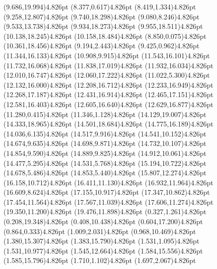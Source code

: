 \documentclass[10pt]{article}
\begin{document}
{{\qdisk(9.686,19.994){4.826pt}%
\qdisk(8.377,0.617){4.826pt}%
\qdisk(8.419,1.334){4.826pt}%
\qdisk(9.258,12.807){4.826pt}%
\qdisk(9.740,18.298){4.826pt}%
\qdisk(9.080,8.246){4.826pt}%
\qdisk(9.533,13.738){4.826pt}%
\qdisk(9.934,18.273){4.826pt}%
\qdisk(9.955,18.511){4.826pt}%
\qdisk(10.138,18.245){4.826pt}%
\qdisk(10.158,18.484){4.826pt}%
\qdisk(8.850,0.075){4.826pt}%
\qdisk(10.361,18.456){4.826pt}%
\qdisk(9.194,2.443){4.826pt}%
\qdisk(9.425,0.962){4.826pt}%
\qdisk(11.344,16.133){4.826pt}%
\qdisk(10.908,9.915){4.826pt}%
\qdisk(11.543,16.101){4.826pt}%
\qdisk(11.732,16.068){4.826pt}%
\qdisk(11.838,17.019){4.826pt}%
\qdisk(11.932,16.034){4.826pt}%
\qdisk(12.010,16.747){4.826pt}%
\qdisk(12.060,17.222){4.826pt}%
\qdisk(11.022,5.300){4.826pt}%
\qdisk(12.132,16.000){4.826pt}%
\qdisk(12.208,16.712){4.826pt}%
\qdisk(12.233,16.949){4.826pt}%
\qdisk(12.268,17.187){4.826pt}%
\qdisk(12.431,16.914){4.826pt}%
\qdisk(12.465,17.151){4.826pt}%
\qdisk(12.581,16.403){4.826pt}%
\qdisk(12.605,16.640){4.826pt}%
\qdisk(12.629,16.877){4.826pt}%
\qdisk(11.280,0.415){4.826pt}%
\qdisk(11.346,1.128){4.826pt}%
\qdisk(14.129,19.007){4.826pt}%
\qdisk(14.333,18.965){4.826pt}%
\qdisk(14.501,18.684){4.826pt}%
\qdisk(14.775,16.189){4.826pt}%
\qdisk(14.036,6.135){4.826pt}%
\qdisk(14.517,9.916){4.826pt}%
\qdisk(14.541,10.152){4.826pt}%
\qdisk(14.674,9.635){4.826pt}%
\qdisk(14.698,9.871){4.826pt}%
\qdisk(14.732,10.107){4.826pt}%
\qdisk(14.854,9.590){4.826pt}%
\qdisk(14.889,9.825){4.826pt}%
\qdisk(14.912,10.061){4.826pt}%
\qdisk(14.477,5.295){4.826pt}%
\qdisk(14.531,5.768){4.826pt}%
\qdisk(15.194,10.722){4.826pt}%
\qdisk(14.678,5.486){4.826pt}%
\qdisk(14.853,5.440){4.826pt}%
\qdisk(15.807,12.274){4.826pt}%
\qdisk(16.158,10.712){4.826pt}%
\qdisk(16.411,11.130){4.826pt}%
\qdisk(16.932,11.964){4.826pt}%
\qdisk(16.609,8.624){4.826pt}%
\qdisk(17.155,10.917){4.826pt}%
\qdisk(17.347,10.862){4.826pt}%
\qdisk(17.454,11.564){4.826pt}%
\qdisk(17.567,11.039){4.826pt}%
\qdisk(17.606,11.274){4.826pt}%
\qdisk(19.350,11.200){4.826pt}%
\qdisk(19.476,11.898){4.826pt}%
\dummycolor
\qdisk(0.327,1.261){4.826pt}%
\qdisk(0.208,19.348){4.826pt}%
\qdisk(0.408,10.438){4.826pt}%
\qdisk(0.604,17.200){4.826pt}%
\qdisk(0.864,0.333){4.826pt}%
\qdisk(1.009,2.031){4.826pt}%
\qdisk(0.968,10.469){4.826pt}%
\qdisk(1.380,15.307){4.826pt}%
\qdisk(1.383,15.790){4.826pt}%
\qdisk(1.531,1.095){4.826pt}%
\qdisk(1.531,10.977){4.826pt}%
\qdisk(1.545,12.664){4.826pt}%
\qdisk(1.584,15.556){4.826pt}%
\qdisk(1.585,15.796){4.826pt}%
\qdisk(1.710,1.102){4.826pt}%
\qdisk(1.697,2.067){4.826pt}%
}}
\end{document}
